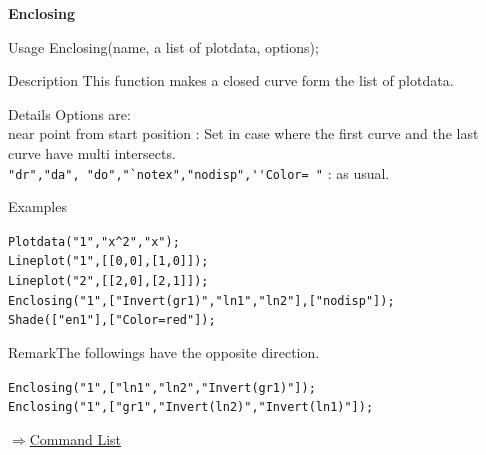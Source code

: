 \documentclass[papersize,a4paper,12pt]{article}
\newenvironment{cmd}[2]{
\hypertarget{#2}{}
\begin{center}{\bf\large #1}\end{center}
\begin{description}
}{
\end{description}
\begin{flushright} \hyperlink{functionlist}{$\Rightarrow$Command List}\end{flushright}
}
\begin{document}
\begin{cmd}{Enclosing}{enclosing}
\item[Usage]Enclosing(name, a list of plotdata, options);
\item[Description]This function makes a closed curve form the list of plotdata.
\item[Details]Options are:\\
near point from start position : Set in case where the first curve and the last curve have multi intersects.\\
\verb|"dr","da", "do","`notex","nodisp",''Color= "| : as usual.
\item[Examples]\mbox{}

\verb|Plotdata("1","x^2","x");|\\
\verb|Lineplot("1",[[0,0],[1,0]]);|\\
\verb|Lineplot("2",[[2,0],[2,1]]);|\\
\verb|Enclosing("1",["Invert(gr1)","ln1","ln2"],["nodisp"]);|\\
\verb|Shade(["en1"],["Color=red"]);|

\begin{center}

\end{center}

\item{Remark}The followings have the opposite direction.

\verb|Enclosing("1",["ln1","ln2","Invert(gr1)"]);|\\
\verb|Enclosing("1",["gr1","Invert(ln2)","Invert(ln1)"]);|
\end{cmd}
\end{document}
